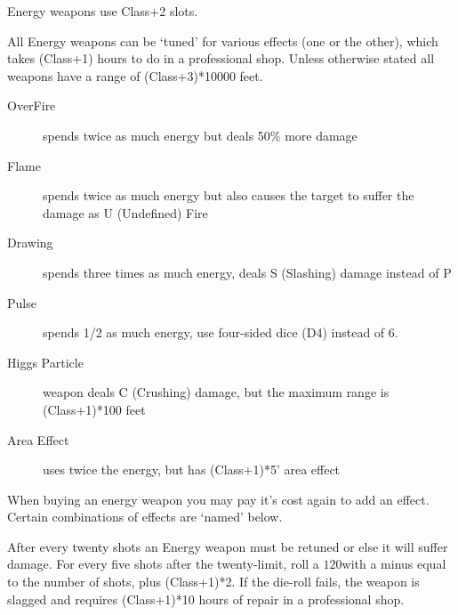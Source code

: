 \documentclass[twoside]{book}
\begin{document}
    {  
      Energy weapons use Class+2 slots. 
    }
  
    {  
      All Energy weapons can be `tuned' for
               various effects (one or the other), which takes (Class+1)
               hours to do in a professional shop. Unless otherwise
               stated all weapons have a range of (Class+3)*10000 feet.
               
    }
  
\begin{description}
    
  \item[ OverFire ] 
    {  
      spends twice as much energy but deals 50\% more
                 damage 
    }
  
  \item[ Flame ] 
    {  
      spends twice as much energy but also causes the
                 target to suffer the damage as U (Undefined) Fire
                 
    }
  
  \item[ Drawing ] 
    {  
      spends three times as much energy, deals S
                 (Slashing) damage instead of P 
    }
  
  \item[ Pulse ] 
    {  
      spends 1/2 as much energy, use four-sided dice
                 (D4) instead of 6. 
    }
  
  \item[ Higgs Particle ] 
    {  
      weapon deals C (Crushing) damage, but the maximum
                 range is (Class+1)*100 feet 
    }
  
  \item[ Area Effect ] 
    {  
      uses twice the energy, but has (Class+1)*5'
                 area effect 
    }
  
\end{description}
  
    {  
      When buying an energy weapon you may pay it's
               cost again to add an effect. Certain combinations of
               effects are `named' below. 
    }
  
    {  
      After every twenty shots an Energy weapon must be
               retuned or else it will suffer damage. For every five
               shots after the twenty-limit, roll a \ensuremath{1}\ensuremath{20}\ensuremath{}with a minus
               equal to the number of shots, plus (Class+1)*2. If the
               die-roll fails, the weapon is slagged and requires
               (Class+1)*10 hours of repair in a professional shop.
               
    }
  
\end{document}
